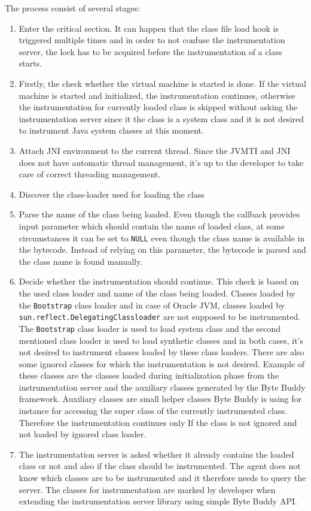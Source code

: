 The process consist of several stages:
\begin{enumerate}
	
	\item Enter the critical section. It can happen that the class file load hook is triggered multiple times and in order to not confuse the instrumentation server, the lock has to be acquired before the instrumentation of a class starts.
	\item Firstly, the check whether the virtual machine is started is done. If the virtual machine is started and initialized, the instrumentation continues, otherwise the instrumentation for currently loaded class is skipped without asking the instrumentation server since it the class is a system class and it is not desired to instrument Java system classes at this moment.
	\item Attach JNI environment to the current thread. Since the JVMTI and JNI does not have automatic thread management, it's up to the developer to take care of correct threading management.
	\item Discover the class-loader used for loading the class
	\item Parse the name of the class being loaded. Even though the callback provides input parameter which should contain the name of loaded class, at some circumstances it can be set to \texttt{NULL} even though the class name is available in the bytecode. Instead of relying on this parameter, the bytecode is parsed and the class name is found manually.
	\item Decide whether the instrumentation should continue. This check is based on the used class loader and name of the class being loaded. Classes loaded by the \texttt{Bootstrap} class loader and in case of Oracle JVM, classes loaded by \texttt{sun.reflect.DelegatingClassloader} are not supposed to be instrumented. 
	The \texttt{Bootstrap} class loader is used to load system class and the second mentioned class loader is used to load synthetic classes and in both cases, it's not desired to instrument classes loaded by these class loaders.
	There are also some ignored classes for which the instrumentation is not desired. Example of these classes are the classes loaded during initialization phase from the instrumentation server and the auxiliary classes generated by the Byte Buddy framework. Auxiliary classes are small helper classes Byte Buddy is using for instance for accessing the super class of the currently instrumented class. Therefore the instrumentation continues only If the class is not ignored and not loaded by ignored class loader.
	\item The instrumentation server is asked whether it already contains the loaded class or not and also if the class should be instrumented. The agent does not know which classes are to be instrumented and it therefore needs to query the server. The classes for instrumentation are marked by developer when extending the instrumentation server library using simple Byte Buddy API. 
	

\end{enumerate}
